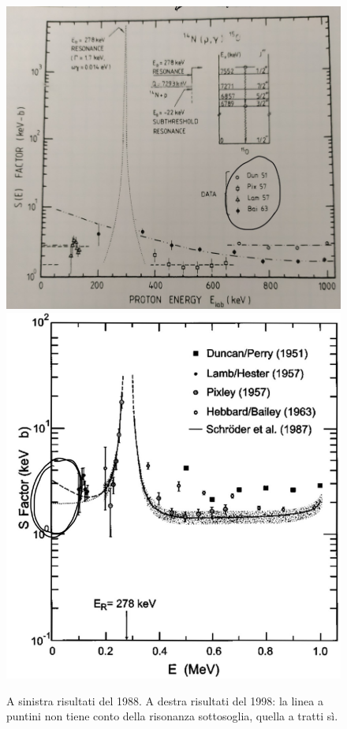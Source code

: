 \begin{figure}[!h]
	\centering
	\includegraphics[scale=0.5]{Immagini/0422_Se.png}
	\includegraphics[scale=0.5]{Immagini/0422_Se2.png}
	\caption{A sinistra risultati del 1988.
	A destra risultati del 1998: la linea a puntini non tiene conto della risonanza sottosoglia, quella a tratti sì.}
	\label{0422_19881998}
\end{figure}


